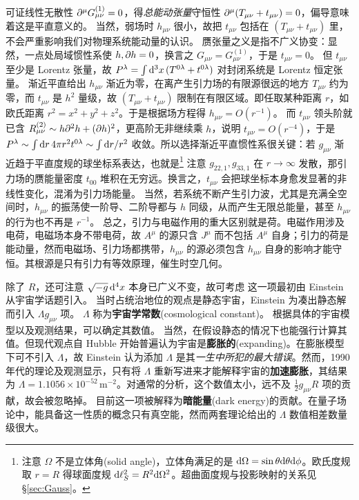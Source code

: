 可证线性无散性 $\partial^\mu G_{\mu\nu}^{(1)}=0$，得\textit{总能动张量}守恒性 $\partial^\mu(T_{\mu\nu} + t_{\mu\nu})=0$，偏导意味着这是平直意义的。
当然，弱场时 $h_{\mu\nu}$ 很小，故把 $t_{\mu\nu}$ 包括在 $(T_{\mu\nu} + t_{\mu\nu})$ 里，不会严重影响我们对物理系统能动量的认识。
赝张量之义是指不广义协变：显然，一点处局域惯性系使 $h,\partial h = 0$，换言之 $G_{\mu\nu}=G_{\mu\nu}^{(1)}$，于是 $t_{\mu\nu}=0$。
但 $t_{\mu\nu}$ 至少是 Lorentz 张量，故 $P^\lambda = \int \dd[3]{x} (T^{0\lambda} + t^{0\lambda})$ 对封闭系统是 Lorentz 恒定张量。
渐近平直给出 $h_{\mu\nu}$ 渐近为零，在离产生引力场的有限源很远的地方 $T_{\mu\nu}$ 约为零，而 $t_{\mu\nu}$ 是 $h^2$ 量级，故 $(T_{\mu\nu} + t_{\mu\nu})$ 限制在有限区域。即任取某种距离 $r$，如欧氏距离 $r^2=x^2+y^2+z^2$。于是根据场方程得 $h_{\mu\nu}=O(r^{-1})$。
而 $t_{\mu\nu}$ 领头阶就已含 $R^{(2)}_{\mu\nu} \sim h \partial^2 h + (\partial h)^2$，更高阶无非继续乘 $h$，说明 $t_{\mu\nu}=O(r^{-4})$，于是 $P^\lambda\sim \int \dd{r} 4\pi r^2 t^{0\lambda} \sim \int \dd r/r^2$ 收敛。所以选择渐近平直惯性系很关键：若 $g_{\mu\nu}$ 渐近趋于平直度规的球坐标系表达，也就是\footnote{注意 $\Omega$ 不是立体角(solid angle)，立体角满足的是 $\dd\Omega=\sin\theta \dd\theta\dd\phi$。欧氏度规取 $r=R$ 得球面度规 $\dd\ell^2_S=R^2\dd\Omega^2$。超曲面度规与投影映射的关系见 \S\ref{sec:Gauss}。}
注意 $g_{22,1},g_{33,1}$ 在 $r\to\infty$ 发散，那引力场的赝能量密度 $t_{00}$ 堆积在无穷远。换言之，$t_{\mu\nu}$ 会把球坐标本身愈发显著的非线性变化，混淆为引力场能量。
当然，若系统不断产生引力波，尤其是充满全空间时，$h_{\mu\nu}$ 的振荡使一阶导、二阶导都与 $h$ 同级，从而产生无限总能量，甚至 $h_{\mu\nu}$ 的行为也不再是 $r^{-1}$。
总之，引力与电磁作用的重大区别就是荷。电磁作用涉及电荷，电磁场本身不带电荷，故 $A^\mu$ 的源只含 $J^\mu$ 而不包括 $A^\mu$ 自身；引力的荷是能动量，然而电磁场、引力场都携带，$h_{\mu\nu}$ 的源必须包含 $h_{\mu\nu}$ 自身的影响才能守恒。其根源是只有引力有等效原理，催生时空几何。

除了 $R$，还可注意 $\sqrt{-g}\dd[4]{x}$ 本身已广义不变，故可考虑
这一项最初由 Einstein 从宇宙学话题引入。
当时占统治地位的观点是静态宇宙，Einstein 为凑出静态解而引入 $\Lambda g_{\mu\nu}$ 项。
$\Lambda$ 称为\textbf{宇宙学常数}(cosmological constant)。
根据具体的宇宙模型以及观测结果，可以确定其数值。
当然，在假设静态的情况下也能强行计算其值。但现代观点自 Hubble 开始普遍认为宇宙是\textbf{膨胀的}(expanding)。在膨胀模型下可不引入 $\Lambda$，故 Einstein 认为添加 $\Lambda$ 是其\textit{一生中所犯的最大错误}。然而，1990 年代的理论及观测显示，只有将 $\Lambda$ 重新写进来才能解释宇宙的\textbf{加速膨胀}，其结果为 $\Lambda=1.1056\times 10^{-52}$\,m$^{-2}$。对通常的分析，这个数值太小，远不及 $\frac12 g_{\mu\nu} R$ 项的贡献，故会被忽略掉。
目前这一项被解释为\textbf{暗能量}(dark energy)的贡献。在量子场论中，能具备这一性质的概念只有真空能，然而两套理论给出的 $\Lambda$ 数值相差数量级很大。

